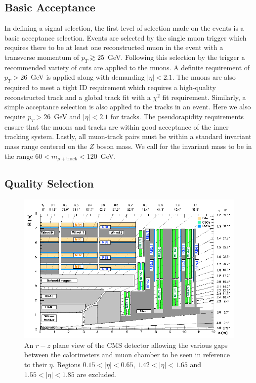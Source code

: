 \documentclass[a4paper,12pt]{article}
\begin{document}
    \subsection{Basic Acceptance}

        In defining a signal selection, the first level of selection made on the
        events is a basic acceptance selection. Events are selected by the
        single muon trigger which requires there to be at least one
        reconstructed muon in the event with a transverse momentum of $p_{T}
        \gtrsim 25$~GeV.  Following this selection by the trigger a recommended
        variety of cuts are applied to the muons. A definite requirement of
        $p_{T} > 26$~GeV is applied along with demanding $|\eta| < 2.1$. The
        muons are also required to meet a tight ID requirement which requires a
        high-quality reconstructed track and a global track fit with a $\chi^2$
        fit requirement. Similarly, a simple acceptance selection is also
        applied to the tracks in an event.  Here we also require $p_{T} >
        26$~GeV and $|\eta| < 2.1$ for tracks. The pseudorapidity requirements
        ensure that the muons and tracks are within good acceptance of the inner
        tracking system.  Lastly, all muon-track pairs must be within a standard
        invariant mass range centered on the $Z$ boson mass. We call for the invariant
        mass to be in the range $60 < m_{\mu + \text{track}} < 120$~GeV.

    \subsection{Quality Selection}

        \begin{figure}[ht]
            \begin{center}
                \includegraphics[scale=0.5]{Figures/CMS_rz_Cutaway.png}
            \end{center}
            \caption{An $r-z$ plane view of the CMS detector\cite{Abbiendi} allowing the
            various gaps between the calorimeters and muon chamber to be seen in
            reference to their $\eta$. Regions $0.15 < |\eta| < 0.65$, $1.42 <
            |\eta| < 1.65$ and $1.55 < |\eta| < 1.85$ are excluded.}
            \label{fig:cms_rz}
        \end{figure}
\end{document}
